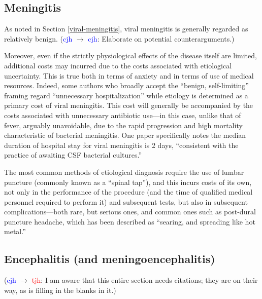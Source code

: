 \documentclass[12pt]{article}
\newcommand{\cjh}{\textcolor{blue}{cjh}}
\newcommand{\tjh}{\textcolor{red}{tjh}}
\newcommand{\msg}[3]{(#1 $\rightarrow$ #2: #3)}
\newcommand{\mcc}[1]{\msg\cjh\cjh{#1}}
\newcommand{\mct}[1]{\msg\cjh\tjh{#1}}
\begin{document}
        \subsection{Meningitis}
            \label{cost-meningitis}
            As noted in Section \ref{viral-meningitis}, viral meningitis is generally regarded as relatively benign. \mcc{Elaborate on potential counterarguments.}

            Moreover, even if the strictly physiological effects of the disease itself are limited, additional costs may incurred due to the costs associated with etiological uncertainty. This is true both in terms of anxiety and in terms of use of medical resources. Indeed, some authors who broadly accept the ``benign, self-limiting'' framing regard ``unnecessary hospitalization'' while etiology is determined as a primary cost of viral meningitis\cite{balada2019cost}. This cost will generally be accompanied by the costs associated with unnecessary antibiotic use---in this case, unlike that of fever, arguably unavoidable, due to the rapid progression and high mortality characteristic of bacterial meningitis. One paper\cite{hasbun2019epidemiology} specifically notes the median duration of hospital stay for viral meningitis is 2 days, ``consistent with the practice of awaiting CSF bacterial cultures.''

            The most common methods of etiological diagnosis require the use of lumbar puncture (commonly known as a ``spinal tap''), and this incurs costs of its own, not only in the performance of the procedure (and the time of qualified medical personnel required to perform it) and subsequent tests, but also in subsequent complications---both rare, but serious ones, and common ones such as post-dural puncture headache, which has been described as ``searing, and spreading like hot metal.''\cite{weir2000sharp}

        \subsection{Encephalitis (and meningoencephalitis)}
            \label{cost-encephalitis}
            \mct{I am aware that this entire section needs citations; they are on their way, as is filling in the blanks in it.}
\end{document}
